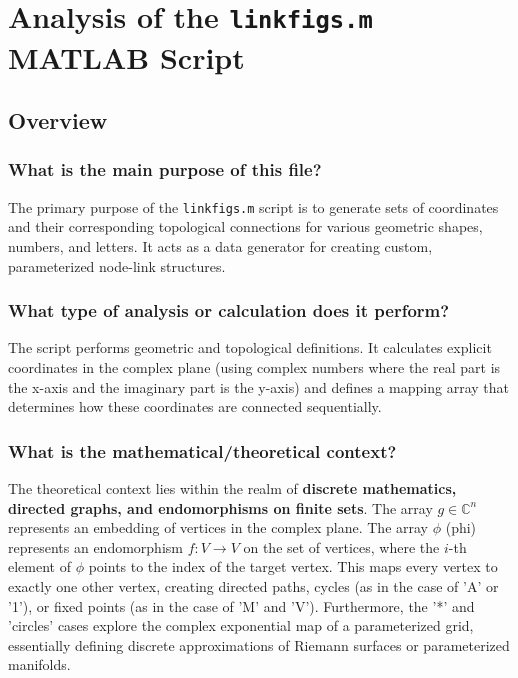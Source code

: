 \chapter{Analysis of the \texttt{linkfigs.m} MATLAB Script}
\date{\today}


\maketitle

\section{Overview}

\subsection*{What is the main purpose of this file?}
The primary purpose of the \texttt{linkfigs.m} script is to generate sets of coordinates and their corresponding topological connections for various geometric shapes, numbers, and letters. It acts as a data generator for creating custom, parameterized node-link structures.

\subsection*{What type of analysis or calculation does it perform?}
The script performs geometric and topological definitions. It calculates explicit coordinates in the complex plane (using complex numbers where the real part is the x-axis and the imaginary part is the y-axis) and defines a mapping array that determines how these coordinates are connected sequentially.

\subsection*{What is the mathematical/theoretical context?}
The theoretical context lies within the realm of \textbf{discrete mathematics, directed graphs, and endomorphisms on finite sets}. 
The array $g \in \mathbb{C}^n$ represents an embedding of vertices in the complex plane. The array $\phi$ (phi) represents an endomorphism $f: V \to V$ on the set of vertices, where the $i$-th element of $\phi$ points to the index of the target vertex. This maps every vertex to exactly one other vertex, creating directed paths, cycles (as in the case of 'A' or '1'), or fixed points (as in the case of 'M' and 'V'). Furthermore, the '*' and 'circles' cases explore the complex exponential map of a parameterized grid, essentially defining discrete approximations of Riemann surfaces or parameterized manifolds.


